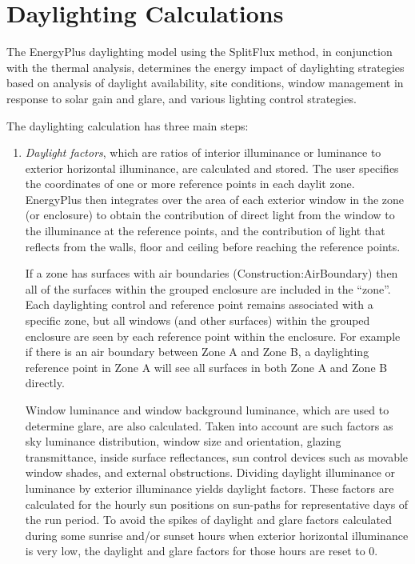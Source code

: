 \section{Daylighting Calculations}\label{daylighting-calculations}

The EnergyPlus daylighting model using the SplitFlux method, in conjunction with the thermal analysis,
determines the energy impact of daylighting strategies based on analysis of daylight availability,
site conditions, window management in response to solar gain and glare, and various lighting control strategies.

The daylighting calculation has three main steps:
\begin{enumerate}
\def\labelenumi{(\arabic{enumi})}
\item
    \emph{Daylight factors}, which are ratios of interior illuminance or luminance to exterior horizontal illuminance, are calculated and stored.
    The user specifies the coordinates of one or more reference points in each daylit zone.
    EnergyPlus then integrates over the area of each exterior window in the zone (or enclosure) to obtain the contribution of direct light from the window to the illuminance at the reference points,
    and the contribution of light that reflects from the walls, floor and ceiling before reaching the reference points. 
    
    If a zone has surfaces with air boundaries (Construction:AirBoundary) 
    then all of the surfaces within the grouped enclosure are included in the ``zone''. Each daylighting control and reference point 
    remains associated with a specific zone, but all windows (and other surfaces) within the grouped enclosure are seen by each reference point within the enclosure. For example if there is an air
    boundary between Zone A and Zone B, a daylighting reference point in Zone A will see all surfaces in both Zone A and Zone B directly.
    
    Window luminance and window background luminance, which are used to determine glare, are also calculated.
    Taken into account are such factors as sky luminance distribution, window size and orientation, glazing transmittance, inside surface reflectances,
    sun control devices such as movable window shades, and external obstructions. Dividing daylight illuminance or luminance by exterior illuminance yields daylight factors.
    These factors are calculated for the hourly sun positions on sun-paths for representative days of the run period.
    To avoid the spikes of daylight and glare factors calculated during some sunrise and/or sunset hours when exterior horizontal illuminance is very low,
    the daylight and glare factors for those hours are reset to 0.


\end{enumerate}
